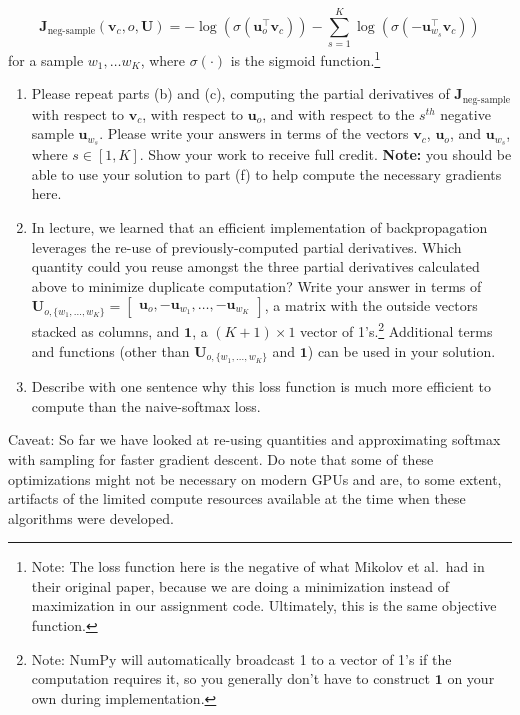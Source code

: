 \documentclass{article}
\begin{document}
\begin{enumerate}[label=(\alph*)]
\begin{equation}
\bm J_{\text{neg-sample}}(\bm v_c, o, \bm U) = -\log(\sigma(\bm u_o^\top \bm v_c)) - \sum_{s=1}^K \log(\sigma(-\bm u_{w_s}^\top \bm v_c))
\end{equation}
for a sample $w_1, \ldots w_K$, where $\sigma(\cdot)$ is the sigmoid function.\footnote{Note: The loss function here is the negative of what Mikolov et al.\ had in their original paper, because we are doing a minimization instead of maximization in our assignment code. Ultimately, this is the same objective function.}

\begin{enumerate}[label=(\roman*)]
\item Please repeat parts (b) and (c), computing the partial derivatives of $\bm J_{\text{neg-sample}}$ with respect to $\bm v_c$, with respect to $\bm u_o$, and with respect to the $s^{th}$ negative sample $\bm u_{w_s}$. Please write your answers in terms of the vectors $\bm v_c$, $\bm u_o$, and $\bm u_{w_s}$, where $s \in [1, K]$. Show your work to receive full credit. \textbf{Note:} you should be able to use your solution to part (f) to help compute the necessary gradients here.

\item In lecture, we learned that an efficient implementation of backpropagation leverages the re-use of previously-computed partial derivatives. Which quantity could you reuse amongst the three partial derivatives calculated above to minimize duplicate computation? Write your answer in terms of \\ $\bm{U}_{o, \{w_1, \dots, w_K\}} = \begin{bmatrix} \bm{u}_o, -\bm{u}_{w_1}, \dots, -\bm{u}_{w_K} \end{bmatrix}$, a matrix with the outside vectors stacked as columns, and $\bm{1}$, a $(K + 1) \times 1$ vector of 1's.\footnote{Note: NumPy will automatically broadcast 1 to a vector of 1's if the computation requires it, so you generally don't have to construct $\bm{1}$ on your own during implementation.}
Additional terms and functions (other than $\bm{U}_{o, \{w_1, \dots, w_K\}}$ and $\bm{1}$) can be used in your solution.
\item Describe with one sentence why this loss function is much more efficient to compute than the naive-softmax loss.
\end{enumerate}

Caveat: So far we have looked at re-using quantities and approximating softmax with sampling for faster gradient descent. Do note that some of these optimizations might not be necessary on modern GPUs and are, to some extent, artifacts of the limited compute resources available at the time when these algorithms were developed.


\end{enumerate}
\end{document}
